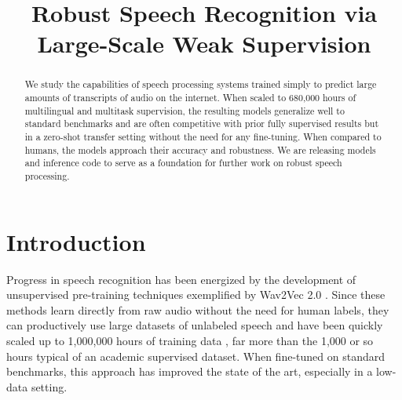 \title{Robust Speech Recognition via Large-Scale Weak Supervision}




\printAffiliationsAndNotice{\icmlEqualContribution} %

\begin{abstract}
We study the capabilities of speech processing systems trained simply to predict large amounts of transcripts of audio on the internet. When scaled to 680,000 hours of multilingual and multitask supervision, the resulting models generalize well to standard benchmarks and are often competitive with prior fully supervised results but in a zero-shot transfer setting without the need for any fine-tuning. When compared to humans, the models approach their accuracy and robustness. We are releasing models and inference code to serve as a foundation for further work on robust speech processing.
\end{abstract}

\section{Introduction}\label{sec:introduction}

Progress in speech recognition has been energized by the development of unsupervised pre-training techniques exemplified by Wav2Vec 2.0 \cite{baevski2020wav2vec2}. Since these methods learn directly from raw audio without the need for human labels, they can productively use large datasets of unlabeled speech and have been quickly scaled up to 1,000,000 hours of training data \cite{zhang2021bigssl}, far more than the 1,000 or so hours typical of an academic supervised dataset. When fine-tuned on standard benchmarks, this approach has improved the state of the art, especially in a low-data setting.

